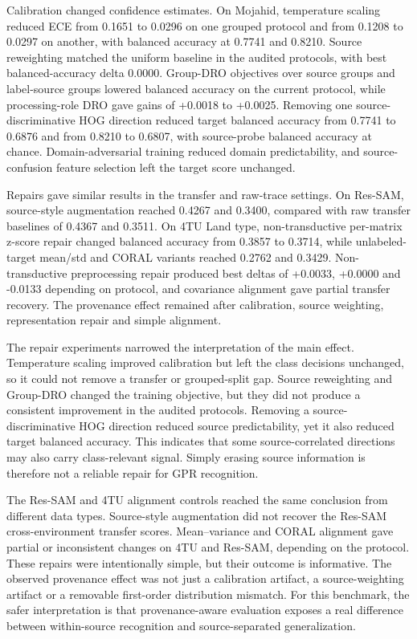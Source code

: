 \documentclass[]{interact}
\begin{document}
Calibration changed confidence estimates. On Mojahid, temperature scaling reduced ECE from 0.1651 to 0.0296 on one grouped protocol and from 0.1208 to 0.0297 on another, with balanced accuracy at 0.7741 and 0.8210. Source reweighting matched the uniform baseline in the audited protocols, with best balanced-accuracy delta 0.0000. Group-DRO objectives over source groups and label-source groups lowered balanced accuracy on the current protocol, while processing-role DRO gave gains of +0.0018 to +0.0025. Removing one source-discriminative HOG direction reduced target balanced accuracy from 0.7741 to 0.6876 and from 0.8210 to 0.6807, with source-probe balanced accuracy at chance. Domain-adversarial training reduced domain predictability, and source-confusion feature selection left the target score unchanged.

Repairs gave similar results in the transfer and raw-trace settings. On Res-SAM, source-style augmentation reached 0.4267 and 0.3400, compared with raw transfer baselines of 0.4367 and 0.3511. On 4TU Land type, non-transductive per-matrix z-score repair changed balanced accuracy from 0.3857 to 0.3714, while unlabeled-target mean/std and CORAL variants reached 0.2762 and 0.3429. Non-transductive preprocessing repair produced best deltas of +0.0033, +0.0000 and -0.0133 depending on protocol, and covariance alignment gave partial transfer recovery. The provenance effect remained after calibration, source weighting, representation repair and simple alignment.

The repair experiments narrowed the interpretation of the main effect. Temperature scaling improved calibration but left the class decisions unchanged, so it could not remove a transfer or grouped-split gap. Source reweighting and Group-DRO changed the training objective, but they did not produce a consistent improvement in the audited protocols. Removing a source-discriminative HOG direction reduced source predictability, yet it also reduced target balanced accuracy. This indicates that some source-correlated directions may also carry class-relevant signal. Simply erasing source information is therefore not a reliable repair for GPR recognition.

The Res-SAM and 4TU alignment controls reached the same conclusion from different data types. Source-style augmentation did not recover the Res-SAM cross-environment transfer scores. Mean--variance and CORAL alignment gave partial or inconsistent changes on 4TU and Res-SAM, depending on the protocol. These repairs were intentionally simple, but their outcome is informative. The observed provenance effect was not just a calibration artifact, a source-weighting artifact or a removable first-order distribution mismatch. For this benchmark, the safer interpretation is that provenance-aware evaluation exposes a real difference between within-source recognition and source-separated generalization.
\end{document}
